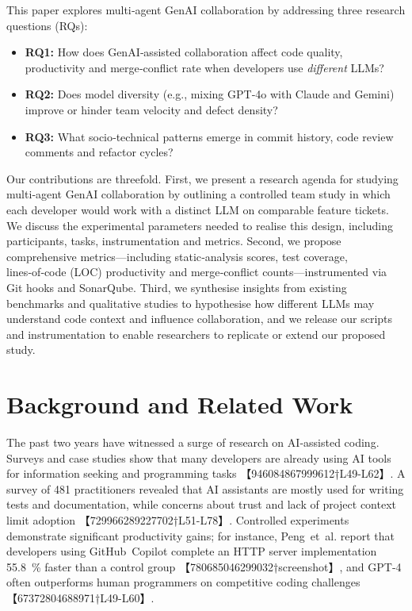 \documentclass[conference]{IEEEtran}
\begin{document}
This paper explores multi‑agent GenAI collaboration by addressing three research questions (RQs):
\begin{itemize}
  \item \textbf{RQ1:} How does GenAI‑assisted collaboration affect code quality, productivity and merge‑conflict rate when developers use \emph{different} LLMs?
  \item \textbf{RQ2:} Does model diversity (e.g., mixing GPT‑4o with Claude and Gemini) improve or hinder team velocity and defect density?
  \item \textbf{RQ3:} What socio‑technical patterns emerge in commit history, code review comments and refactor cycles?
\end{itemize}

Our contributions are threefold.  First, we present a research agenda for studying multi‑agent GenAI collaboration by outlining a controlled team study in which each developer would work with a distinct LLM on comparable feature tickets.  We discuss the experimental parameters needed to realise this design, including participants, tasks, instrumentation and metrics.  Second, we propose comprehensive metrics—including static‑analysis scores, test coverage, lines‑of‑code (LOC) productivity and merge‑conflict counts—instrumented via Git hooks and SonarQube.  Third, we synthesise insights from existing benchmarks and qualitative studies to hypothesise how different LLMs may understand code context and influence collaboration, and we release our scripts and instrumentation to enable researchers to replicate or extend our proposed study.

\section{Background and Related Work}
The past two years have witnessed a surge of research on AI‑assisted coding.  Surveys and case studies show that many developers are already using AI tools for information seeking and programming tasks 【946084867999612†L49-L62】.  A survey of 481 practitioners revealed that AI assistants are mostly used for writing tests and documentation, while concerns about trust and lack of project context limit adoption 【729966289227702†L51-L78】.  Controlled experiments demonstrate significant productivity gains; for instance, Peng et al. report that developers using GitHub Copilot complete an HTTP server implementation 55.8 \% faster than a control group 【780685046299032†screenshot】, and GPT‑4 often outperforms human programmers on competitive coding challenges 【67372804688971†L49-L60】.
\end{document}

